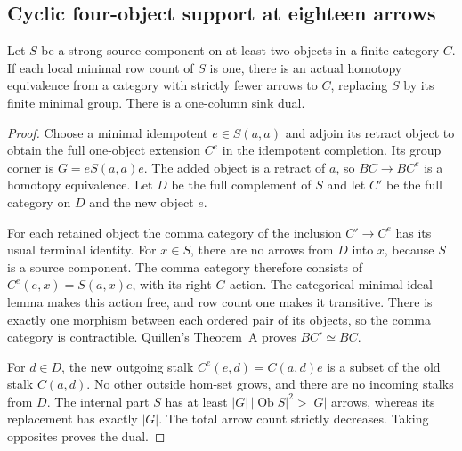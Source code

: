 \subsection{Cyclic four-object support at eighteen arrows}

\begin{lemma}
\label{CP2:A-source-minimal-group-collapse}
Let $S$ be a strong source component on at least two objects in
a finite category $C$. If each local minimal row count of $S$
is one, there is an actual homotopy equivalence from a category
with strictly fewer arrows to $C$, replacing $S$ by its finite
minimal group. There is a one-column sink dual.
\end{lemma}
\begin{proof}
Choose a minimal idempotent $e\in S(a,a)$ and adjoin its retract
object to obtain the full one-object extension $C^e$ in the
idempotent completion. Its group corner is $G=eS(a,a)e$.
The added object is a retract of $a$, so
$BC\to BC^e$ is a homotopy equivalence. Let $D$ be the full
complement of $S$ and let $C'$ be the full category on $D$ and
the new object $e$.

For each retained object the comma category of the inclusion
$C'\to C^e$ has its usual terminal identity. For $x\in S$,
there are no arrows from $D$ into $x$, because $S$ is a source
component. The comma category therefore consists of
$C^e(e,x)=S(a,x)e$, with its right $G$ action. The categorical
minimal-ideal lemma makes this action free, and row count one
makes it transitive. There is exactly one morphism between
each ordered pair of its objects, so the comma category is
contractible. Quillen's Theorem~A proves $BC'\simeq BC$.

For $d\in D$, the new outgoing stalk $C^e(e,d)=C(a,d)e$ is a
subset of the old stalk $C(a,d)$. No other outside hom-set grows,
and there are no incoming stalks from $D$. The internal part
$S$ has at least $|G|\,|\operatorname{Ob}S|^2>|G|$ arrows,
whereas its replacement has exactly $|G|$. The total arrow
count strictly decreases. Taking opposites proves the dual.
\end{proof}

